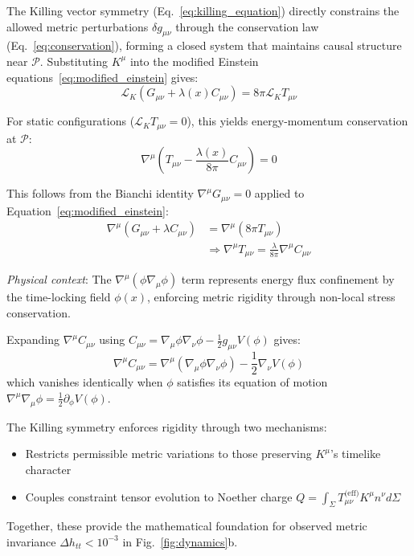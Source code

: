 \documentclass[twocolumn]{article}
\newcommand{\fpit}{\mathcal{P}}
\newcommand{\lagrange}{\lambda(x)}
\begin{document}
	The Killing vector symmetry (Eq.~\ref{eq:killing_equation}) directly constrains the allowed metric perturbations \(\delta g_{\mu\nu}\) through the conservation law (Eq.~\ref{eq:conservation}), forming a closed system that maintains causal structure near \(\fpit\). Substituting \(K^\mu\) into the modified Einstein equations~\eqref{eq:modified_einstein} gives:
	\begin{equation}
		\mathcal{L}_K (G_{\mu\nu} + \lagrange C_{\mu\nu}) = 8\pi \mathcal{L}_K T_{\mu\nu}
	\end{equation}
	
	For static configurations (\(\mathcal{L}_K T_{\mu\nu} = 0\)), this yields energy-momentum conservation at \(\fpit\):
	\begin{equation}
		\nabla^\mu \left( T_{\mu\nu} - \frac{\lagrange}{8\pi} C_{\mu\nu} \right) = 0
\label{eq:conservation}
	\end{equation}
	
	This follows from the Bianchi identity $\nabla^\mu G_{\mu\nu} = 0$ applied to Equation~\eqref{eq:modified_einstein}:
	\begin{equation}
		\begin{split}
			\nabla^\mu(G_{\mu\nu} + \lambda C_{\mu\nu}) &= \nabla^\mu(8\pi T_{\mu\nu}) \\
			&\Rightarrow \nabla^\mu T_{\mu\nu} = \frac{\lambda}{8\pi}\nabla^\mu C_{\mu\nu}
		\end{split}
	\end{equation}
	
	\emph{Physical context}: The \(\nabla^\mu(\phi\nabla_\mu\phi)\) term represents energy flux confinement by the time-locking field \(\phi(x)\), enforcing metric rigidity through non-local stress conservation.
	
	Expanding $\nabla^\mu C_{\mu\nu}$ using $C_{\mu\nu} = \nabla_\mu\phi\nabla_\nu\phi - \frac{1}{2}g_{\mu\nu}V(\phi)$ gives:
	\begin{equation}
		\nabla^\mu C_{\mu\nu} = \nabla^\mu(\nabla_\mu\phi\nabla_\nu\phi) - \frac{1}{2}\nabla_\nu V(\phi)
	\end{equation}
	which vanishes identically when $\phi$ satisfies its equation of motion $\nabla^\mu\nabla_\mu\phi = \frac{1}{2}\partial_\phi V(\phi)$.
	
	The Killing symmetry enforces rigidity through two mechanisms: 
	\begin{itemize}
		\item Restricts permissible metric variations to those preserving \(K^\mu\)'s timelike character
		\item Couples constraint tensor evolution to Noether charge \(Q = \int_\Sigma T_{\mu\nu}^{\text{(eff)}} K^\mu n^\nu d\Sigma\)
	\end{itemize}
	Together, these provide the mathematical foundation for observed metric invariance \(\Delta h_{tt} < 10^{-3}\) in Fig.~\ref{fig:dynamics}b.
	
\end{document}
